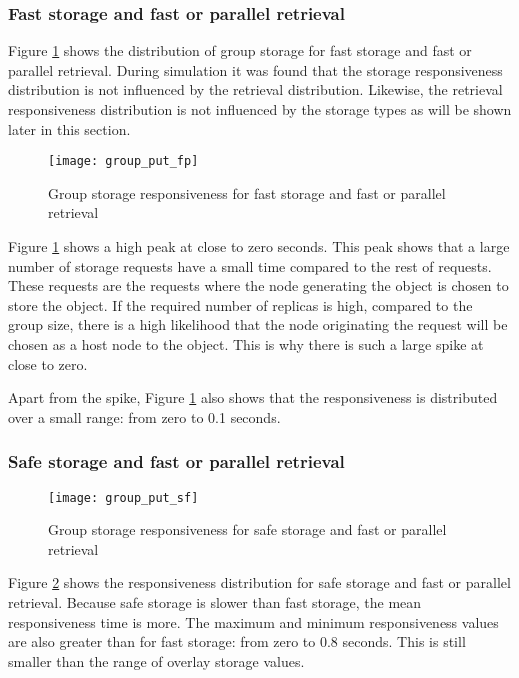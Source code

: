\subsubsection{Fast storage and fast or parallel retrieval}
Figure \ref{fig_group_put_fp} shows the distribution of group storage for fast storage and fast or parallel retrieval. During simulation it was found that the storage responsiveness distribution is not influenced by the retrieval distribution. Likewise, the retrieval responsiveness distribution is not influenced by the storage types as will be shown later in this section.

\begin{figure}[htbp]
 \centering
 \texttt{[image: group\_put\_fp]}
 \caption{Group storage responsiveness for fast storage and fast or parallel retrieval}
 \label{fig_group_put_fp}
\end{figure}
%
Figure \ref{fig_group_put_fp} shows a high peak at close to zero seconds. This peak shows that a large number of storage requests have a small time compared to the rest of requests. These requests are the requests where the node generating the object is chosen to store the object. If the required number of replicas is high, compared to the group size, there is a high likelihood that the node originating the request will be chosen as a host node to the object. This is why there is such a large spike at close to zero.

Apart from the spike, Figure \ref{fig_group_put_fp} also shows that the responsiveness is distributed over a small range: from zero to 0.1 seconds.

\subsubsection{Safe storage and fast or parallel retrieval}
\begin{figure}[htbp]
 \centering
 \texttt{[image: group\_put\_sf]}
 \caption{Group storage responsiveness for safe storage and fast or parallel retrieval}
 \label{fig_group_put_sf}
\end{figure}
%
Figure \ref{fig_group_put_sf} shows the responsiveness distribution for safe storage and fast or parallel retrieval. Because safe storage is slower than fast storage, the mean responsiveness time is more. The maximum and minimum responsiveness values are also greater than for fast storage: from zero to 0.8 seconds. This is still smaller than the range of overlay storage values.

